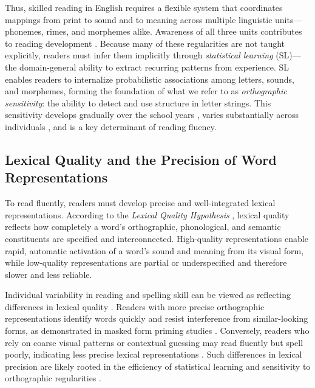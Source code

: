 Thus, skilled reading in English requires a flexible system that coordinates mappings from print to sound and to meaning across multiple linguistic units—phonemes, rimes, and morphemes alike. Awareness of all three units contributes to reading development \citep{mahonyReadingAbilitySensitivity2000}. Because many of these regularities are not taught explicitly, readers must infer them implicitly through \textit{statistical learning} (SL)—the domain-general ability to extract recurring patterns from experience. SL enables readers to internalize probabilistic associations among letters, sounds, and morphemes, forming the foundation of what we refer to as \textit{orthographic sensitivity}: the ability to detect and use structure in letter strings. This sensitivity develops gradually over the school years \citep{treimanSpellingStatisticalLearning2006}, varies substantially across individuals \citep{arciuliStatisticalLearningRelated2012}, and is a key determinant of reading fluency.

\subsection{Lexical Quality and the Precision of Word Representations}

To read fluently, readers must develop precise and well-integrated lexical representations. According to the \textit{Lexical Quality Hypothesis} \citep{perfettiLexicalQualityHypothesis2002, perfettiReadingAbilityLexical2007, perfettiLexicalQualityRevisited2017}, lexical quality reflects how completely a word’s orthographic, phonological, and semantic constituents are specified and interconnected. High-quality representations enable rapid, automatic activation of a word’s sound and meaning from its visual form, while low-quality representations are partial or underspecified and therefore slower and less reliable.

Individual variability in reading and spelling skill can be viewed as reflecting differences in lexical quality \citep{andrewsLexicalExpertiseReading2009, andrewsLexicalPrecisionSkilled2010, andrewsIndividualDifferencesSkilled2012}. Readers with more precise orthographic representations identify words quickly and resist interference from similar-looking forms, as demonstrated in masked form priming studies \citep{forsterRepetitionPrimingFrequency1984, andrewsLexicalPrecisionSkilled2010}. Conversely, readers who rely on coarse visual patterns or contextual guessing may read fluently but spell poorly, indicating less precise lexical representations \citep{frithSurfaceDevelopmentalDyslexia2017}. Such differences in lexical precision are likely rooted in the efficiency of statistical learning and sensitivity to orthographic regularities \citep{sharePhonologicalRecodingSelfteaching1995}.

